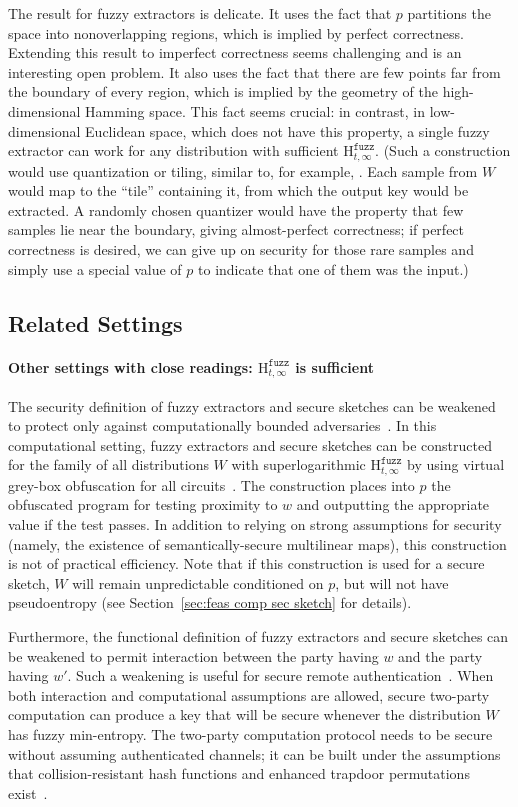 \documentclass[11pt]{article}
\newcommand{\secref}[1]{\mbox{Section~\ref{#1}}}
\newcommand{\Hfuzz}{\mathrm{H}^{\mathtt{fuzz}}_{t,\infty}}
\begin{document}
The result for fuzzy extractors is delicate.  It uses the fact that $p$ partitions the space into nonoverlapping regions, which is implied by perfect correctness.  Extending this result to imperfect correctness seems challenging and is an interesting open problem. It also uses the fact that there are few points far from the boundary of every region, which is implied by the geometry of  the high-dimensional Hamming space.  This fact seems crucial: in contrast, in low-dimensional Euclidean space, which does not have this property, a single fuzzy extractor can work for any distribution with sufficient $\Hfuzz$. (Such a construction would use quantization or tiling, similar to, for example, \cite{CK03,LT03,CZC04,LC06,BDHTV10,VTOSS10}.  Each sample from $W$ would map to the ``tile'' containing it, from which the output key would be extracted. A randomly chosen quantizer would have the property that few samples lie near the boundary, giving almost-perfect correctness; if perfect correctness is desired, we can give up on security for those rare samples and simply use a special value of $p$ to indicate that one of them was the input.)

\subsection{Related Settings}
\label{sec:related settings}
\paragraph{Other settings with close readings:  $\Hfuzz$ is sufficient}
The security definition of fuzzy extractors and secure sketches can be weakened to protect only against computationally bounded adversaries~\cite{fuller2013computational}.   In this computational setting, fuzzy extractors and secure sketches can be constructed for the family of all distributions $W$ with superlogarithmic $\Hfuzz$ by using virtual grey-box obfuscation for all circuits~\cite{BitanskyCKP14}. The construction places into $p$ the obfuscated program for testing proximity to $w$ and outputting the appropriate value if the test passes.  In addition to relying on strong assumptions for security (namely, the existence of semantically-secure multilinear maps), this construction is not of practical efficiency. Note that if this construction is used for a secure sketch, $W$ will remain unpredictable conditioned on $p$, but will not have pseudoentropy (see  \secref{sec:feas comp sec sketch} for details).

Furthermore, the functional definition of fuzzy extractors and secure sketches can be weakened to permit interaction between the party having $w$ and the party having $w'$. Such a weakening is useful for secure remote authentication~\cite{Boyen05secureremote}. When both interaction and computational assumptions are allowed, secure two-party computation can produce a key that will be secure whenever the distribution $W$ has fuzzy min-entropy.  The two-party computation protocol needs to be secure without assuming authenticated channels; it can be built under the assumptions that collision-resistant hash functions and enhanced trapdoor permutations exist~\cite{DBLP:journals/joc/BarakCLPR11}.
\end{document}
